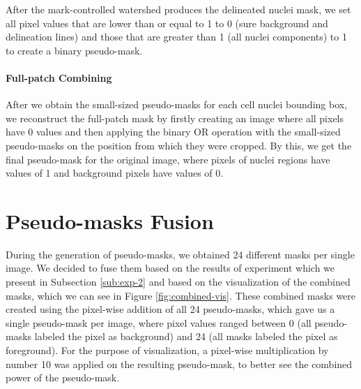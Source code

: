 After the mark-controlled watershed produces the delineated nuclei mask, we set all pixel values that are lower than or equal to 1 to 0 (sure background and delineation lines) and those that are greater than 1 (all nuclei components) to 1 to create a binary pseudo-mask.

\paragraph{Full-patch Combining}
After we obtain the small-sized pseudo-masks for each cell nuclei bounding box, we reconstruct the full-patch mask by firstly creating an image where all pixels have 0 values and then applying the binary OR operation with the small-sized pseudo-masks on the position from which they were cropped. By this, we get the final pseudo-mask for the original image, where pixels of nuclei regions have values of 1 and background pixels have values of 0.

\section{Pseudo-masks Fusion}
\label{section:mask-fusion}
During the generation of pseudo-masks, we obtained 24 different masks per single image. We decided to fuse them based on the results of experiment which we present in Subsection \ref{sub:exp-2} and based on the visualization of the combined masks, which we can see in Figure \ref{fig:combined-vis}. These combined masks were created using the pixel-wise addition of all 24 pseudo-masks, which gave us a single pseudo-mask per image, where pixel values ranged between 0 (all pseudo-masks labeled the pixel as background) and 24 (all masks labeled the pixel as foreground). For the purpose of visualization, a pixel-wise multiplication by number 10 was applied on the resulting pseudo-mask, to better see the combined power of the pseudo-mask.

